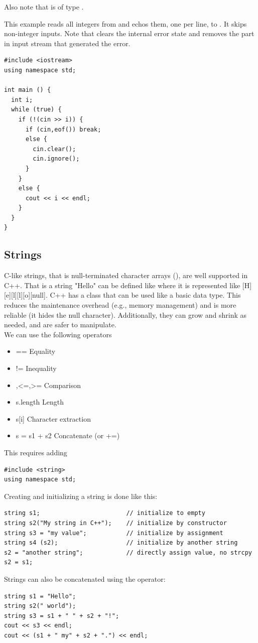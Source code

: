 \documentclass[english, 11pt]{article}
\begin{document}
  Also note that  is of type .

  \begin{exmp}
  This example reads all integers from  and echos them, one per line, to . It skips non-integer inputs. Note that  clears the internal error state and  removes the part in input stream that generated the error.
    \begin{lstlisting}
#include <iostream>
using namespace std;

int main () {
  int i;
  while (true) {
    if (!(cin >> i)) {
      if (cin,eof()) break;
      else {
        cin.clear();
        cin.ignore();
      }
    }
    else {
      cout << i << endl;
    }
  }
}
    \end{lstlisting}
  \end{exmp}

  \subsection{Strings}

  C-like strings, that is null-terminated character arrays (), are well supported in C++. That is a string "Hello" can be defined like  where it is represented like [H][e][l][l][o][null]. C++ has a  class that can be used like a basic data type. This reduces the maintenance overhead (e.g., memory management) and is more reliable (it hides the null character). Additionally, they can grow and shrink as needed, and are safer to manipulate. \\

  We can use the following  operators
  \begin{itemize}
    \item == Equality
    \item != Inequality
    \item <,>,<=,>= Comparison
    \item s.length Length
    \item s[i] Character extraction
    \item s = s1 + s2 Concatenate (or +=)
  \end{itemize}

  This requires adding
  \begin{lstlisting}
#include <string>
using namespace std;
  \end{lstlisting}
Creating and initializing a string is done like this:
\begin{lstlisting}
string s1;                        // initialize to empty
string s2("My string in C++");    // initialize by constructor
string s3 = "my value";           // initialize by assignment
string s4 (s2);                   // initialize by another string
s2 = "another string";            // directly assign value, no strcpy
s2 = s1;
\end{lstlisting}
Strings can also be concatenated using the \tc{+} operator:
\begin{lstlisting}
string s1 = "Hello";
string s2(" world");
string s3 = s1 + " " + s2 + "!";
cout << s3 << endl;
cout << (s1 + " my" + s2 + ".") << endl;
\end{lstlisting}
\end{document}
